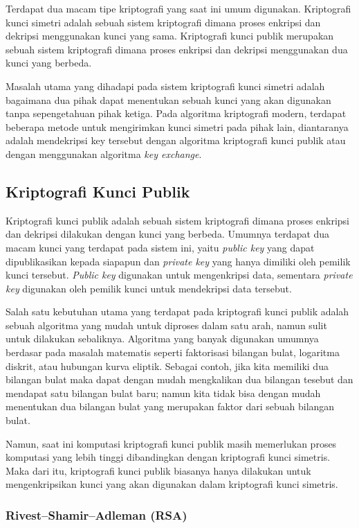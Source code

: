   Terdapat dua macam tipe kriptografi yang saat ini umum digunakan. Kriptografi kunci simetri adalah sebuah sistem kriptografi dimana proses enkripsi dan dekripsi menggunakan kunci yang sama. Kriptografi kunci publik merupakan sebuah sistem kriptografi dimana proses enkripsi dan dekripsi menggunakan dua kunci yang berbeda.

  Masalah utama yang dihadapi pada sistem kriptografi kunci simetri adalah bagaimana dua pihak dapat menentukan sebuah kunci yang akan digunakan tanpa sepengetahuan pihak ketiga. Pada algoritma kriptografi modern, terdapat beberapa metode untuk mengirimkan kunci simetri pada pihak lain, diantaranya adalah mendekripsi key tersebut dengan algoritma kriptografi kunci publik atau dengan menggunakan algoritma \textit{key exchange}.

  \subsection{Kriptografi Kunci Publik}

    Kriptografi kunci publik adalah sebuah sistem kriptografi dimana proses enkripsi dan dekripsi dilakukan dengan kunci yang berbeda. Umumnya terdapat dua macam kunci yang terdapat pada sistem ini, yaitu \textit{public key} yang dapat dipublikasikan kepada siapapun dan \textit{private key} yang hanya dimiliki oleh pemilik kunci tersebut. \textit{Public key} digunakan untuk mengenkripsi data, sementara \textit{private key} digunakan oleh pemilik kunci untuk mendekripsi data tersebut.

    Salah satu kebutuhan utama yang terdapat pada kriptografi kunci publik adalah sebuah algoritma yang mudah untuk diproses dalam satu arah, namun sulit untuk dilakukan sebaliknya. Algoritma yang banyak digunakan umumnya berdasar pada masalah matematis seperti faktorisasi bilangan bulat, logaritma diskrit, atau hubungan kurva eliptik. Sebagai contoh, jika kita memiliki dua bilangan bulat maka dapat dengan mudah mengkalikan dua bilangan tesebut dan mendapat satu bilangan bulat baru; namun kita tidak bisa dengan mudah menentukan dua bilangan bulat yang merupakan faktor dari sebuah bilangan bulat.

    Namun, saat ini komputasi kriptografi kunci publik masih memerlukan proses komputasi yang lebih tinggi dibandingkan dengan kriptografi kunci simetris. Maka dari itu, kriptografi kunci publik biasanya hanya dilakukan untuk mengenkripsikan kunci yang akan digunakan dalam kriptografi kunci simetris.

    \subsubsection{Rivest–Shamir–Adleman (RSA)}

